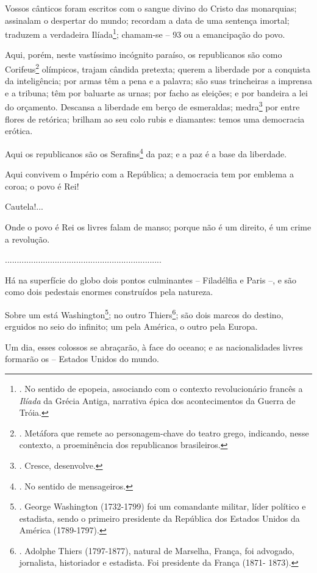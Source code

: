Vossos cânticos foram escritos com o sangue divino do Cristo das
monarquias; assinalam o despertar do mundo; recordam a data de uma
sentença imortal; traduzem a verdadeira Ilíada\footnote{. No sentido de
  epopeia, associando com o contexto revolucionário francês a
  \emph{Ilíada} da Grécia Antiga, narrativa épica dos acontecimentos da
  Guerra de Tróia.}; chamam-se -- 93 ou a emancipação do povo.

Aqui, porém, neste vastíssimo incógnito paraíso, os republicanos são
como Corifeus\footnote{. Metáfora que remete ao personagem-chave do
  teatro grego, indicando, nesse contexto, a proeminência dos
  republicanos brasileiros.} olímpicos, trajam cândida pretexta; querem
a liberdade por a conquista da inteligência; por armas têm a pena e a
palavra; são suas trincheiras a imprensa e a tribuna; têm por baluarte
as urnas; por facho as eleições; e por bandeira a lei do orçamento.
Descansa a liberdade em berço de esmeraldas; medra\footnote{. Cresce,
  desenvolve.} por entre flores de retórica; brilham ao seu colo rubis e
diamantes: temos uma democracia erótica.

Aqui os republicanos são os Serafins\footnote{. No sentido de
  mensageiros.} da paz; e a paz é a base da liberdade.

Aqui convivem o Império com a República; a democracia tem por emblema a
coroa; o povo é Rei!

Cautela!...

Onde o povo é Rei os livres falam de manso; porque não é um direito, é
um crime a revolução.

..................................................................

Há na superfície do globo dois pontos culminantes -- Filadélfia e Paris
--, e são como dois pedestais enormes construídos pela natureza.

Sobre um está Washington\footnote{. George Washington (1732-1799) foi um
  comandante militar, líder político e estadista, sendo o primeiro
  presidente da República dos Estados Unidos da América (1789-1797).};
no outro Thiers\footnote{. Adolphe Thiers (1797-1877), natural de
  Marselha, França, foi advogado, jornalista, historiador e estadista.
  Foi presidente da França (1871- 1873).};
sã\protect\hypertarget{Secao_Sem_Titulo-48}{}{}o dois marcos do destino,
erguidos no seio do infinito; um pela América, o outro pela Europa.

Um dia, esses colossos se abraçarão, à face do oceano; e as
nacionalidades livres formarão os -- Estados Unidos do mundo.

